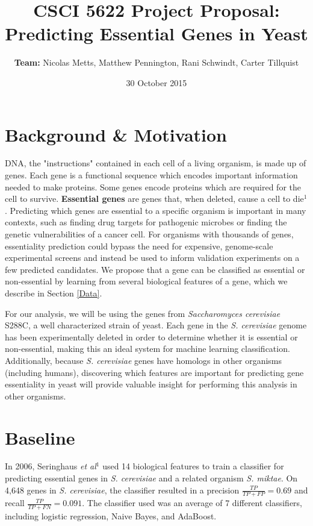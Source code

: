 \documentclass{article}
\title{CSCI 5622 Project Proposal: Predicting Essential Genes in Yeast}
\author{\textbf{Team:} Nicolas Metts, Matthew Pennington, Rani Schwindt, Carter Tillquist}
\date{30 October 2015}
\begin{document}
\maketitle

\section{Background \& Motivation}
DNA, the "instructions" contained in each cell of a living organism, is made up of genes. Each gene is a functional sequence which encodes important information needed to make proteins. Some genes encode proteins which are required for the cell to survive. \textbf{Essential genes} are genes that, when deleted, cause a cell to die$^1$. Predicting which genes are essential to a specific organism is important in many contexts, such as finding drug targets for pathogenic microbes or finding the genetic vulnerabilities of a cancer cell. For organisms with thousands of genes, essentiality prediction could bypass the need for expensive, genome-scale experimental screens and instead be used to inform validation experiments on a few predicted candidates. We propose that a gene can be classified as essential or non-essential by learning from several biological features of a gene, which we describe in Section \ref{Data}. 

\vspace{3mm}

\noindent
For our analysis, we will be using the genes from \textit{Saccharomyces cerevisiae} S288C, a well characterized strain of yeast. Each gene in the \textit{S. cerevisiae} genome has been experimentally deleted in order to determine whether it is essential or non-essential, making this an ideal system for machine learning classification. Additionally, because \textit{S. cerevisiae} genes have homologs in other organisms (including humans), discovering which features are important for predicting gene essentiality in yeast will provide valuable insight for performing this analysis in other organisms.

\section{Baseline}

In 2006, Seringhaus \textit{et al}$^1$ used 14 biological features to train a classifier for predicting essential genes in \textit{S. cerevisiae} and a related organism \textit{S. miktae}. On 4,648 genes in \textit{S. cerevisiae}, the classifier resulted in a precision $\frac{TP}{TP+FP} = 0.69$ and recall $\frac{TP}{TP+FN} = 0.091$. The classifier used was an average of 7 different classifiers, including logistic regression, Naive Bayes, and AdaBoost.
\end{document}

